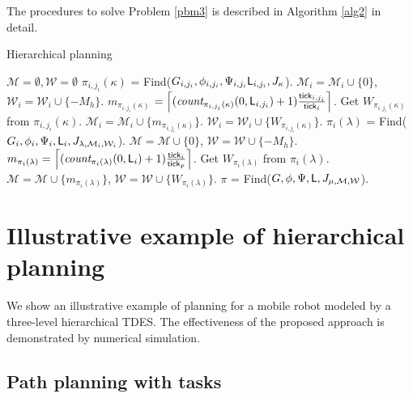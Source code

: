 \documentclass[journal,twoside,web]{IEEEtran}
\newcommand{\tick}{{\sf tick}}
\newcommand{\Len}{{\sf L}}
\newcommand{\M}{\mathcal{M}}
\newcommand{\W}{\mathcal{W}}
\begin{document}
%
The procedures to solve Problem \ref{pbm3} is described in Algorithm \ref{alg2} in detail.
%
\begin{algorithm}
\caption{Hierarchical planning} \label{alg2}
\begin{algorithmic}
%
\State $\mathcal{M}=\emptyset,\mathcal{W}=\emptyset$
		\State ${\pi_{i,j_i}(\kappa)}$ = Find($G_{i,j_i},\phi_{i,j_i},\Psi_{i,j_i}\Len_{i,j_i},J_\kappa$).
		\State $\mathcal{M}_i=\mathcal{M}_i\cup\{0\}$, $\mathcal{W}_i=\mathcal{W}_i\cup\{-M_h\}$.
		\Else
		\State $m_{\pi_{i,j_i}(\kappa)}$
		\State \hspace{1cm}$=\left\lceil (\textit{count}_{\pi_{i,j_i}(\kappa)}(0,\Len_{i,j_i})+1)\frac{\tick_{i,j_i}}{\tick_i} \right\rceil $.
		\State Get $W_{\pi_{i,j_i}(\kappa)}$ from $\pi_{i,j_i}(\kappa)$.
		\State $\mathcal{M}_i=\mathcal{M}_i\cup\{m_{\pi_{i,j_i}(\kappa)}\}$.
		\State $\mathcal{W}_i=\mathcal{W}_i\cup\{W_{\pi_{i,j_i}(\kappa)}\}$.
		\EndIf
	\EndFor
\EndFor
\EndFor
{}
\For{ $\lambda\in \Lambda$}
		\State ${\pi_i(\lambda)}$ = Find($G_i,\phi_i,\Psi_i,\Len_i,J_{\lambda,\M_i,\W_i}$).
		\State $\mathcal{M}=\mathcal{M}\cup\{0\}$, $\mathcal{W}=\mathcal{W}\cup\{-M_h\}$.
		\Else
		\State $m_{\pi_i(\lambda)}=\left\lceil (\textit{count}_{\pi_i(\lambda)}(0,\Len_i)+1)\frac{\tick_i}{\tick_p} \right\rceil $.
		\State Get $W_{\pi_i(\lambda)}$ from $\pi_i(\lambda)$.
		\State $\mathcal{M}=\mathcal{M}\cup\{m_{\pi_i(\lambda)}\}$, $\mathcal{W}=\mathcal{W}\cup\{W_{\pi_i(\lambda)}\}$.
		\EndIf
\EndFor
\EndFor
%
\State ${\pi}$ = Find($G,\phi,\Psi,\Len,J_{\mu,\M,\W}$).
\end{algorithmic}
\end{algorithm}
%
%
%
%
\section{Illustrative example of hierarchical planning}\label{simResult}
%
%
%
We show an illustrative example of planning for a mobile robot modeled by a three-level hierarchical TDES. %
The effectiveness of the proposed approach is demonstrated by numerical simulation.
%
\subsection{Path planning with tasks}
\end{document}
